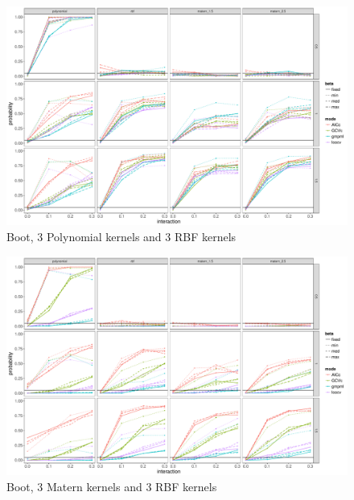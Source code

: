 \documentclass[11pt]{article}
\begin{document}
\begin{figure}
\begin{center}
\includegraphics[width=0.9\columnwidth]{exp_B4} 
\caption{Boot, 3 Polynomial kernels and 3 RBF kernels}
\label{fig:res}
\end{center}
\end{figure}

\begin{figure}
\begin{center}
\includegraphics[width=0.9\columnwidth]{exp_B5} 
\caption{Boot, 3 Matern kernels and 3 RBF kernels}
\label{fig:res}
\end{center}
\end{figure}


\clearpage



\end{document}
